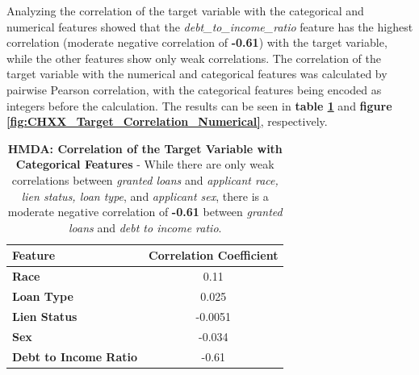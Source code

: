 Analyzing the correlation of the target variable with the categorical and numerical features showed that the \textit{debt\_to\_income\_ratio} feature has the highest correlation (moderate negative correlation of \textbf{-0.61}) with the target variable, while the other features show only weak correlations. 
The correlation of the target variable with the numerical and categorical features was calculated by pairwise Pearson correlation, with the categorical features being encoded as integers before the calculation.
The results can be seen in \textbf{table \ref{tab:CHXX_Target_Correlation_Categorical}} and \textbf{figure \ref{fig:CHXX_Target_Correlation_Numerical}}, respectively.


\begin{table}[!htbp]
    \centering
    \begin{tabular}{l c}
    \toprule
    \textbf{Feature} & \textbf{Correlation Coefficient} \\
    \midrule
    \textbf{Race} & 0.11 \\
    \textbf{Loan Type} & 0.025 \\
    \textbf{Lien Status} & -0.0051 \\
    \textbf{Sex} & -0.034 \\
    \textbf{Debt to Income Ratio} & -0.61 \\
    \bottomrule
    \end{tabular}
    \medskip
    \caption[HMDA: Correlation of the Target Variable with Categorical Features]{\textbf{HMDA: Correlation of the Target Variable with Categorical Features} - While there are only weak correlations between \textit{granted loans} and \textit{applicant race, lien status, loan type}, and \textit{applicant sex}, there is a moderate negative correlation of \textbf{-0.61} between \textit{granted loans} and \textit{debt to income ratio}.}
    \label{tab:CHXX_Target_Correlation_Categorical}
\end{table}

